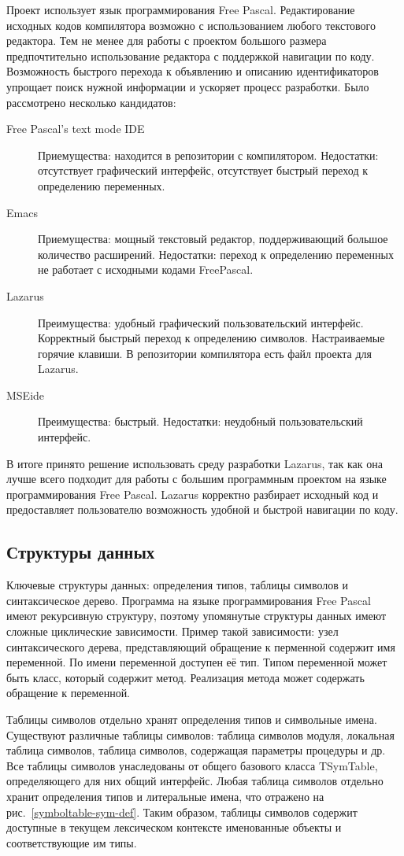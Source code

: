 \documentclass{imcs}
\begin{document}
Проект использует язык программирования Free Pascal. Редактирование исходных кодов
компилятора возможно с использованием любого текстового редактора. Тем не менее
для работы с проектом большого размера предпочтительно использование редактора с
поддержкой навигации по коду. Возможность быстрого перехода к объявлению и описанию
идентификаторов упрощает поиск нужной информации и ускоряет процесс разработки.
Было рассмотрено несколько кандидатов:
\begin{description}
  \item[Free Pascal's text mode IDE] Приемущества: находится в репозитории с 
компилятором. Недостатки: отсутствует графический интерфейс, отсутствует
быстрый переход к определению переменных.
  \item[Emacs] Приемущества: мощный текстовый редактор, поддерживающий большое
количество расширений. Недостатки: переход к определению переменных не работает
с исходными кодами FreePascal.
  \item[Lazarus] Преимущества: удобный графический пользовательский интерфейс.
Корректный быстрый переход к определению символов. Настраиваемые горячие клавиши.
В репозитории компилятора есть файл проекта для Lazarus.
  \item[MSEide] Преимущества: быстрый. Недостатки: неудобный 
пользовательский интерфейс.
\end{description} 
В итоге принято решение использовать среду разработки Lazarus, так как она
лучше всего подходит для работы с большим программным проектом на
языке программирования Free Pascal. Lazarus корректно разбирает
исходный код и предоставляет пользователю возможность удобной и
быстрой навигации по коду.

\subsection{Структуры данных}

Ключевые структуры данных: определения типов, таблицы символов и
синтаксическое дерево. Программа на языке программирования Free Pascal имеют рекурсивную структуру,
поэтому упомянутые структуры данных имеют сложные циклические зависимости. Пример такой 
зависимости: узел синтаксического дерева, представляющий обращение к перменной содержит имя
переменной. По имени переменной доступен её тип. Типом переменной может быть класс, который
содержит метод. Реализация метода  может содержать обращение к переменной.

Таблицы символов отдельно хранят определения типов и символьные имена. Существуют 
различные таблицы символов: таблица символов модуля, локальная таблица символов, таблица
символов, содержащая параметры процедуры и др. Все таблицы символов унаследованы от общего
базового класса TSymTable, определяющего для них общий интерфейс. Любая таблица символов отдельно
хранит определения типов и литеральные имена, что отражено на рис.~\ref{symboltable-sym-def}.
Таким образом, таблицы символов содержит доступные в текущем лексическом контексте
именованные объекты и соответствующие им типы.
\end{document}
